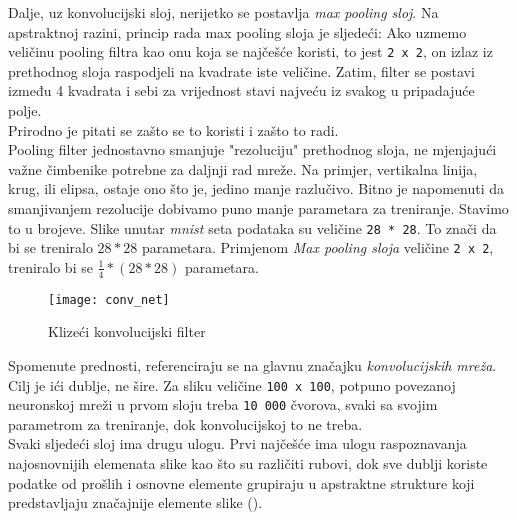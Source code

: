 Dalje, uz konvolucijski sloj, nerijetko se postavlja \emph{max pooling sloj}. Na apstraktnoj razini, princip rada max pooling sloja je sljedeći: Ako uzmemo veličinu pooling filtra kao onu koja se najčešće koristi, to jest \texttt{2 x 2}, on izlaz iz prethodnog sloja raspodjeli na kvadrate iste veličine. Zatim, filter se postavi između 4 kvadrata i sebi za vrijednost stavi najveću iz svakog u pripadajuće polje. \\ 
Prirodno je pitati se zašto se to koristi i zašto to radi. \\
Pooling filter jednostavno smanjuje "rezoluciju" prethodnog sloja, ne mjenjajući važne čimbenike potrebne za daljnji rad mreže. Na primjer, vertikalna linija, krug, ili elipsa, ostaje ono što je, jedino manje razlučivo. 
Bitno je napomenuti da smanjivanjem rezolucije dobivamo puno manje parametara za treniranje. 
Stavimo to u brojeve. Slike unutar \emph{mnist} seta podataka su veličine \texttt{28 * 28}. To znači da bi se treniralo $28*28$ parametara. Primjenom \emph{Max pooling sloja} veličine \texttt{2 x 2}, treniralo bi se $\frac{1}{4}*(28*28)$ parametara. 

\begin{figure}[h!]
	\centering
	\texttt{[image: conv\_net]}
	 \caption{Klizeći konvolucijski filter}
 	 \label{fig:conv_net_1}
\end{figure}

Spomenute prednosti, referenciraju se na glavnu značajku \emph{konvolucijskih mreža}. 
Cilj je ići dublje, ne šire. 
Za sliku veličine \texttt{100 x 100}, potpuno povezanoj neuronskoj mreži u prvom sloju treba \texttt{10 000} čvorova, svaki sa svojim parametrom za treniranje, dok konvolucijskoj to ne treba. \\
Svaki sljedeći sloj ima drugu ulogu. 
Prvi najčešće ima ulogu raspoznavanja najosnovnijih elemenata slike kao što su različiti rubovi, dok sve dublji koriste podatke od prošlih i osnovne elemente grupiraju u apstraktne strukture koji predstavljaju značajnije elemente slike (\cite{o2015introduction}).
